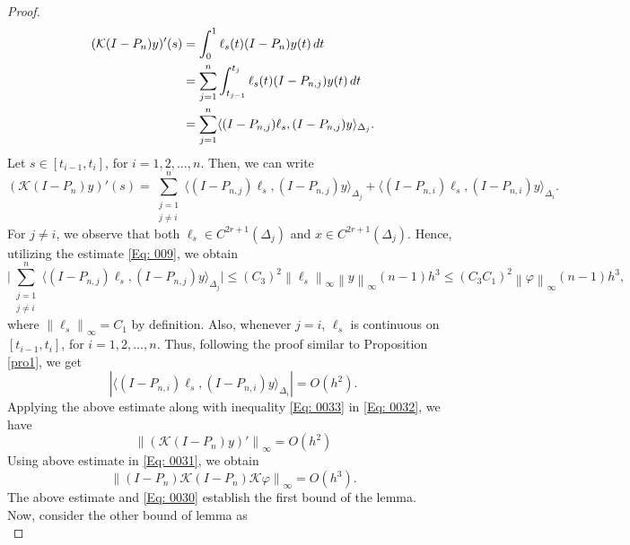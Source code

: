 \documentclass[10pt,a4paper]{amsart}
\newcommand{\norm}[1]{\left\lVert #1\right\rVert}
\begin{document}
\begin{proof}
\begin{align*}
		(\mathcal{K}(I - P_n)y)'(s) &= \int_{0}^{1} \ell_s(t) (I - P_n) y(t) \, dt \notag \\
		&= \sum_{j=1}^{n} \int_{t_{j-1}}^{t_j} \ell_s(t) (I - P_{n,j}) y(t) \, dt \notag \\
		&= \sum_{j=1}^{n} \langle (I - P_{n,j}) \ell_s, (I - P_{n,j}) y \rangle_{\Delta_j}.
	\end{align*}
	Let \( s \in [t_{i-1}, t_i]\), for \(i=1,2,\ldots,n\). Then, we can write
	\begin{equation} \label{Eq: 0032}
		(\mathcal{K}(I - P_n)y)'(s) = \sum_{\substack{j=1 \\  j\ne i} }^{n} \langle (I - P_{n,j}) \ell_s, (I - P_{n,j}) y \rangle_{\Delta_j} + \langle (I - P_{n,i}) \ell_s, (I - P_{n,i}) y \rangle_{\Delta_i}.
	\end{equation}
	For \( j \neq i \), we observe that both \( \ell_s \in C^{2r+1}(\Delta_j) \) and \( x \in C^{2r+1}(\Delta_j)\). Hence, utilizing the estimate \eqref{Eq: 009}, we obtain  
	\begin{equation} \label{Eq: 0033}  
		\bigg|\sum_{\substack{j=1 \\ j\ne i} }^{n} \langle (I - P_{n,j}) \ell_s, (I - P_{n,j}) y \rangle_{\Delta_j} \bigg| \leq (C_3)^2 \norm{\ell_s}_\infty \norm{y}_\infty (n-1) h^{3} \leq  (C_3 C_1)^2 \norm{\varphi}_\infty (n-1) h^{3},
	\end{equation}  
	where \(\norm{\ell_s}_\infty = C_1\) by definition. Also, whenever \(j = i\), \(\ell_s\) is continuous on \( [t_{i-1}, t_i]\), for \(i=1,2,\ldots,n\). Thus, following the proof similar to Proposition \ref{pro1}, we get
	\begin{equation*}
		|\langle (I - P_{n,i}) \ell_s, (I - P_{n,i}) y \rangle_{\Delta_i}| = O\left(h^{2} \right).
	\end{equation*}
	Applying the above estimate along with inequality \eqref{Eq: 0033} in \eqref{Eq: 0032}, we have
	\begin{equation*}
		\norm{	(\mathcal{K}(I - P_n)y)'}_\infty = O\left(h^{2} \right)
	\end{equation*}
	Using above estimate in \eqref{Eq: 0031}, we obtain
	\begin{equation*}
		\norm{(I - P_n) \mathcal{K}(I - P_n)\mathcal{K}\varphi}_\infty = O\left(h^{3} \right).
	\end{equation*}
	The above estimate and \eqref{Eq: 0030} establish the first bound of the lemma.\\
	Now, consider the other bound of lemma as
	\begin{equation*}

\end{equation*}
\end{proof}
\end{document}
